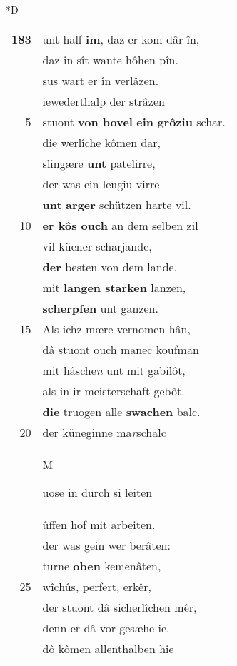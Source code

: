 \documentclass[8pt,a4paper,notitlepage]{article}
\begin{document}
\begin{table}[ht]
\begin{minipage}[t]{0.5\linewidth}
\small
\begin{center}*D
\end{center}
\begin{tabular}{rl}
\textbf{183} & unt half \textbf{im}, daz er kom dâr în,\\ 
 & daz in sît wante hôhen pîn.\\ 
 & sus wart er în verlâzen.\\ 
 & iewederthalp der strâzen\\ 
5 & stuont \textbf{von bovel} \textbf{ein} \textbf{grôziu} schar.\\ 
 & die werlîche kômen dar,\\ 
 & slingære \textbf{unt} patelirre,\\ 
 & der was ein lengiu virre\\ 
 & \textbf{unt} \textbf{arger} schützen harte vil.\\ 
10 & \textbf{er kôs ouch} an dem selben zil\\ 
 & vil küener scharjande,\\ 
 & \textbf{der} besten von dem lande,\\ 
 & mit \textbf{langen starken} lanzen,\\ 
 & \textbf{scherpfen} unt ganzen.\\ 
15 & Als ichz mære vernomen hân,\\ 
 & dâ stuont ouch manec koufman\\ 
 & mit hâsche\textit{n} unt mit gabilôt,\\ 
 & als in ir meisterschaft gebôt.\\ 
 & \textbf{die} truogen alle \textbf{swachen} balc.\\ 
20 & der küneginne ma\textit{r}schalc\\ 
 & \begin{large}M\end{large}uose in durch si leiten\\ 
 & ûffen hof mit arbeiten.\\ 
 & der was gein wer berâten:\\ 
 & turne \textbf{oben} kemenâten,\\ 
25 & wîchûs, perfert, erkêr,\\ 
 & der stuont dâ sicherlîchen mêr,\\ 
 & denn er dâ vor gesæhe ie.\\ 
 & dô kômen allenthalben hie\\ 

\end{tabular}
\end{minipage}
\end{table}
\end{document}
